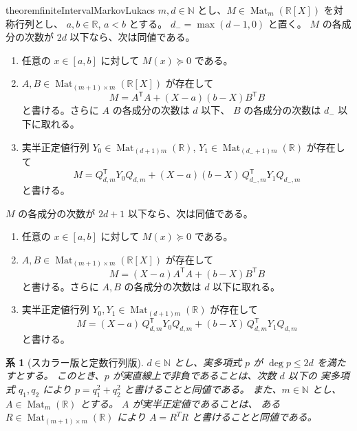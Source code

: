 \documentclass[uplatex,dvipdfmx]{jsarticle}
\newcommand{\Poly}{\mathbb{R}[X]}
\newcommand{\Mat}{\operatorname{Mat}}
\newcommand{\psd}{\succeq 0}
\theoremstyle{matrixsosdefinition}
\newtheorem{corollary}[theorem]{系}
\begin{document}
\begin{restatable}{theorem}{finiteIntervalMarkovLukacs}
  \(m,d\in\mathbb{N}\) とし、\(M\in\Mat_m(\Poly)\) を対称行列とし、
  \(a,b\in\mathbb{R}\), \(a<b\) とする。
  \(d_-=\max(d-1,0)\) と置く。
  \(M\) の各成分の次数が \(2d\) 以下なら、次は同値である。
  \begin{enumerate}[label=(E\arabic*)]
    \item 任意の \(x\in[a,b]\) に対して \(M(x)\psd\) である。
    \item \(A,B\in\Mat_{(m+1)\times m}(\Poly)\) が存在して
      \[
        M=A^{\mathsf T}A+(X-a)(b-X)B^{\mathsf T}B
      \]
      と書ける。さらに \(A\) の各成分の次数は \(d\) 以下、
      \(B\) の各成分の次数は \(d_-\) 以下に取れる。
    \item 実半正定値行列
      \(Y_0\in\Mat_{(d+1)m}(\mathbb{R})\),
      \(Y_1\in\Mat_{(d_-+1)m}(\mathbb{R})\) が存在して
      \[
        M=
        Q_{d,m}^{\mathsf T}Y_0Q_{d,m}
        +(X-a)(b-X)\,Q_{d_-,m}^{\mathsf T}Y_1Q_{d_-,m}
      \]
      と書ける。
  \end{enumerate}
  \(M\) の各成分の次数が \(2d+1\) 以下なら、次は同値である。
  \begin{enumerate}[label=(O\arabic*)]
    \item 任意の \(x\in[a,b]\) に対して \(M(x)\psd\) である。
    \item \(A,B\in\Mat_{(m+1)\times m}(\Poly)\) が存在して
      \[
        M=(X-a)A^{\mathsf T}A+(b-X)B^{\mathsf T}B
      \]
      と書ける。さらに \(A,B\) の各成分の次数は \(d\) 以下に取れる。
    \item 実半正定値行列
      \(Y_0,Y_1\in\Mat_{(d+1)m}(\mathbb{R})\) が存在して
      \[
        M=
        (X-a)\,Q_{d,m}^{\mathsf T}Y_0Q_{d,m}
        +(b-X)\,Q_{d,m}^{\mathsf T}Y_1Q_{d,m}
      \]
      と書ける。
  \end{enumerate}
\end{restatable}

\begin{corollary}[スカラー版と定数行列版]
  \(d\in\mathbb{N}\) とし、実多項式 \(p\) が \(\deg p\le2d\) を満たすとする。
  このとき、\(p\) が実直線上で非負であることは、次数 \(d\) 以下の
  実多項式 \(q_1,q_2\) により
  \(p=q_1^2+q_2^2\) と書けることと同値である。
  また、\(m\in\mathbb{N}\) とし、\(A\in\Mat_m(\mathbb{R})\) とする。
  \(A\) が実半正定値であることは、
  ある \(R\in\Mat_{(m+1)\times m}(\mathbb{R})\) により
  \(A=R^TR\) と書けることと同値である。
\end{corollary}
\end{document}
